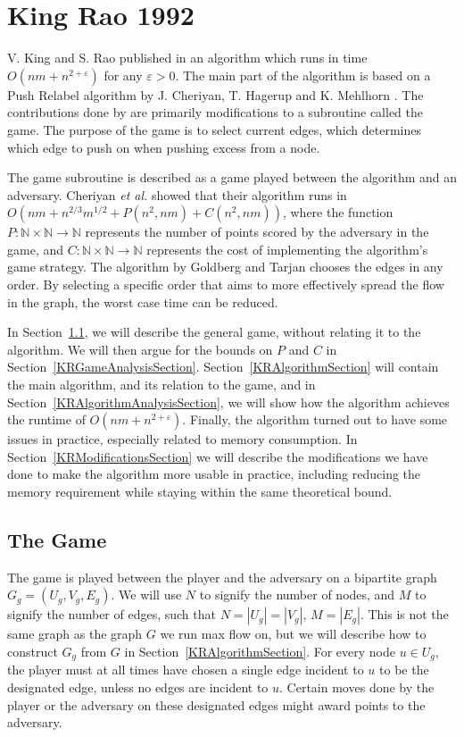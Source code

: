 \section{King Rao 1992}
\label{KR92Secton}

V. King and S. Rao published in \cite{King1992} an algorithm which runs in time $O(nm+n^{2+\varepsilon})$ for any $\varepsilon>0$.
The main part of the algorithm is based on a Push Relabel algorithm by J. Cheriyan, T. Hagerup and K. Mehlhorn \cite{Cheriyan1990}. 
The contributions done by \cite{King1992} are primarily modifications to a subroutine called the game. 
The purpose of the game is to select current edges, which determines which edge to push on when pushing excess from a node.

The game subroutine is described as a game played between the algorithm and an adversary. 
Cheriyan {\it et al.} \cite{Cheriyan1990} showed that their algorithm runs in $O(nm + n^{2/3}m^{1/2}+P(n^2, nm)+C(n^2, nm))$, 
where the function $P : \mathbb{N}\times\mathbb{N}\to\mathbb{N}$ represents the number of points scored by the adversary in the game, 
and $C : \mathbb{N}\times\mathbb{N}\to\mathbb{N}$ represents the cost of implementing the algorithm's game strategy. 
The algorithm by Goldberg and Tarjan \cite{Goldberg1988} chooses the edges in any order. 
By selecting a specific order that aims to more effectively spread the flow in the graph, the worst case time can be reduced.
 
In Section~\ref{KRGameSection}, we will describe the general game, without relating it to the algorithm. 
We will then argue for the bounds on $P$ and $C$ in Section~\ref{KRGameAnalysisSection}.
Section~\ref{KRAlgorithmSection} will contain the main algorithm, and its relation to the game,
and in Section~\ref{KRAlgorithmAnalysisSection}, we will show how the algorithm achieves the runtime of $O(nm+n^{2+\varepsilon})$.
Finally, the algorithm turned out to have some issues in practice, especially related to memory consumption. 
In Section~\ref{KRModificationsSection} we will describe the modifications we have done to make the algorithm more usable in practice, including reducing the memory requirement while staying within the same theoretical bound.


\subsection{The Game}
\label{KRGameSection}

The game is played between the player and the adversary on a bipartite graph $G_g=(U_g, V_g, E_g)$.
We will use $N$ to signify the number of nodes, and $M$ to signify the number of edges, such that $N=|U_g|=|V_g|$, $M=|E_g|$.
This is not the same graph as the graph $G$ we run max flow on, but we will describe how to construct $G_g$ from $G$ in Section~\ref{KRAlgorithmSection}.
For every node $u\in U_g$, the player must at all times have chosen a single edge incident to $u$ to be the designated edge, unless no edges are incident to $u$.
Certain moves done by the player or the adversary on these designated edges might award points to the adversary.

